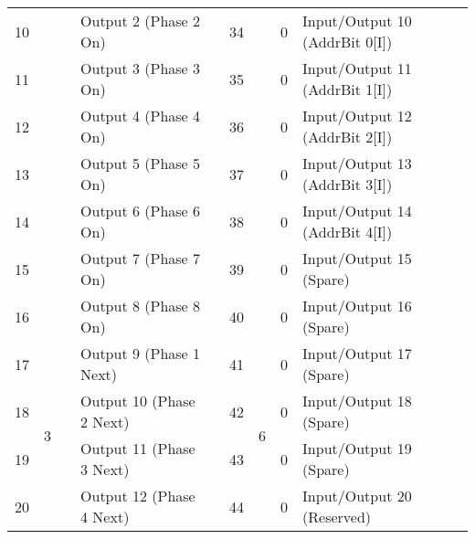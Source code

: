 \documentclass[]{article}
\begin{document}
\begin{landscape}
\begin{table}[]
\begin{tabular}{lllllllll}
			10           &                    &                   & Output 2 (Phase 2 On)         &                   & 34           &                    & 0                 & Input/Output 10 (AddrBit 0{[}I{]})    \\
			11           &                    &                   & Output 3 (Phase 3 On)         &                   & 35           &                    & 0                 & Input/Output 11 (AddrBit 1{[}I{]})    \\
			12           &                    &                   & Output 4 (Phase 4 On)         &                   & 36           &                    & 0                 & Input/Output 12 (AddrBit 2{[}I{]})    \\
			13           &                    &                   & Output 5 (Phase 5 On)         &                   & 37           &                    & 0                 & Input/Output 13 (AddrBit 3{[}I{]})    \\
			14           &                    &                   & Output 6 (Phase 6 On)         &                   & 38           &                    & 0                 & Input/Output 14 (AddrBit 4{[}I{]})    \\
			15           &                    &                   & Output 7 (Phase 7 On)         &                   & 39           &                    & 0                 & Input/Output 15 (Spare)               \\
			16           &                    &                   & Output 8 (Phase 8 On)         &                   & 40           &                    & 0                 & Input/Output 16 (Spare)               \\ \cline{1-4} \cline{6-9} 
			17           & \multirow{8}{*}{3} & \multirow{7}{*}{} & Output 9 (Phase 1 Next)       &                   & 41           & \multirow{8}{*}{6} & 0                 & Input/Output 17 (Spare)               \\
			18           &                    &                   & Output 10 (Phase 2 Next)      &                   & 42           &                    & 0                 & Input/Output 18 (Spare)               \\
			19           &                    &                   & Output 11 (Phase 3 Next)      &                   & 43           &                    & 0                 & Input/Output 19 (Spare)               \\
			20           &                    &                   & Output 12 (Phase 4 Next)      &                   & 44           &                    & 0                 & Input/Output 20 (Reserved)            \\

\end{tabular}
\end{table}
\end{landscape}
\end{document}
